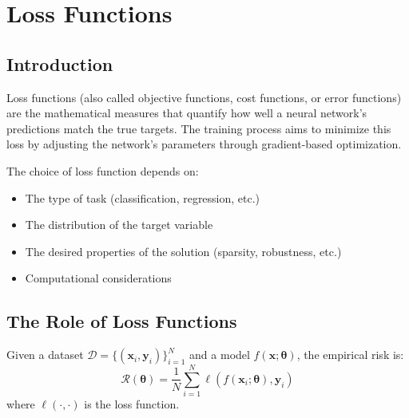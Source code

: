 %
%
%

\clearpage
\cleardoublepage

\chapter{Loss Functions}

\section{Introduction}

Loss functions (also called objective functions, cost functions, or error functions) are the mathematical measures that quantify how well a neural network's predictions match the true targets. The training process aims to minimize this loss by adjusting the network's parameters through gradient-based optimization.

The choice of loss function depends on:
\begin{itemize}
    \item The type of task (classification, regression, etc.)
    \item The distribution of the target variable
    \item The desired properties of the solution (sparsity, robustness, etc.)
    \item Computational considerations
\end{itemize}

\section{The Role of Loss Functions}

Given a dataset $\mathcal{D} = \{(\mathbf{x}_i, \mathbf{y}_i)\}_{i=1}^{N}$ and a model $f(\mathbf{x}; \mathbf{\theta})$, the empirical risk is:
\begin{equation}
\mathcal{R}(\mathbf{\theta}) = \frac{1}{N}\sum_{i=1}^{N} \ell(f(\mathbf{x}_i; \mathbf{\theta}), \mathbf{y}_i)
\end{equation}
where $\ell(\cdot, \cdot)$ is the loss function.

